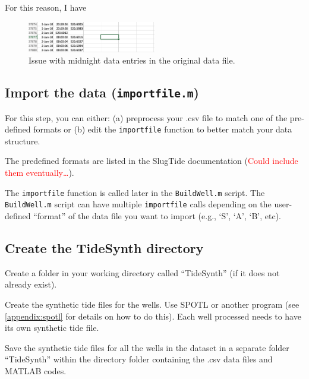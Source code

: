 \documentclass[11pt]{article}
\begin{document}
For this reason, I have 

\begin{figure}[ht!]
    \centering
\includegraphics[width=0.5\textwidth]{../figs/howto/howto_excel-blank.png}
\caption{Issue with midnight data entries in the original data file.}
\end{figure}

\subsection{Import the data (\texttt{importfile.m})}

For this step, you can either: (a) preprocess your .csv file to match one of
the pre-defined formats or (b) edit the \texttt{importfile} function to better
match your data structure. 

The predefined formats are listed in the SlugTide documentation
(\textcolor{red}{Could include them eventually\dots}). 

The \texttt{importfile} function is called later in the \texttt{BuildWell.m}
script.  The \texttt{BuildWell.m} script can have multiple \texttt{importfile}
calls depending on the user-defined “format” of the data file you want to
import (e.g., `S', `A', `B', etc).


\subsection{Create the TideSynth directory}

Create a folder in your working directory called ``TideSynth'' (if it does not
already exist).

Create the synthetic tide files for the wells. Use SPOTL or another program
(see \ref{appendix:spotl} for details on how to do this). 
Each well processed needs to have its own synthetic tide file.

Save the synthetic tide files for all the wells in the dataset in a separate
folder ``TideSynth'' within the directory folder containing the .csv data files
and MATLAB codes.
\end{document}
